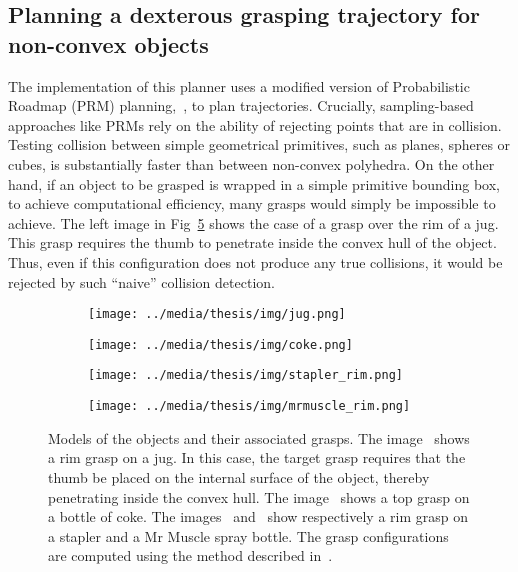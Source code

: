 \subsection{Planning a dexterous grasping trajectory for non-convex objects}\label{sec:ch07:non_convex_obj}

The implementation of this planner uses a modified version of Probabilistic Roadmap (PRM) planning,~\citep{bib:kavraki_1996}, to plan trajectories. Crucially, sampling-based approaches like PRMs rely on the ability of rejecting points that are in collision. Testing collision between simple geometrical primitives, such as planes, spheres or cubes, is substantially faster than between non-convex polyhedra. On the other hand, if an object to be grasped is wrapped in a simple primitive bounding box, to achieve computational efficiency, many grasps would simply be impossible to achieve. The left image in Fig~\ref{fig:07:grasps} shows the case of a grasp over the rim of a jug. This grasp requires the thumb to penetrate inside the convex hull of the object. Thus, even if this configuration does not produce any true collisions, it would be rejected by such ``naive'' collision detection. 

\begin{figure}[!t]
\centering
 \begin{subfigure}[t]{0.48\textwidth}
       \texttt{[image: ../media/thesis/img/jug.png]}
       \caption{}\label{fig:07:jug_rim}
  \end{subfigure} 
  \quad
   \begin{subfigure}[t]{0.48\textwidth}
       \texttt{[image: ../media/thesis/img/coke.png]}
       \caption{}\label{fig:07:coke_top}
  \end{subfigure} 
  \vspace{2mm}
  \begin{subfigure}[t]{0.48\textwidth}
       \texttt{[image: ../media/thesis/img/stapler\_rim.png]}
       \caption{}\label{fig:07:stapler_rim}
  \end{subfigure} 
  \quad
   \begin{subfigure}[t]{0.48\textwidth}
       \texttt{[image: ../media/thesis/img/mrmuscle\_rim.png]}
       \caption{}\label{fig:07:mrmuscle_rim}
  \end{subfigure} 
\caption[Object models with associated grasp]{Models of the objects and their associated grasps. The image~ shows a rim grasp on a jug. In this case, the target grasp requires that the thumb be placed on the internal surface of the object, thereby penetrating inside the convex hull. The image~ shows a top grasp on a bottle of coke. The images~ and~ show respectively a rim grasp on a stapler and a Mr Muscle spray bottle. The grasp configurations are computed using the method described in~\citep{bib:kopicki_2014}.}
\label{fig:07:grasps}
\end{figure}

